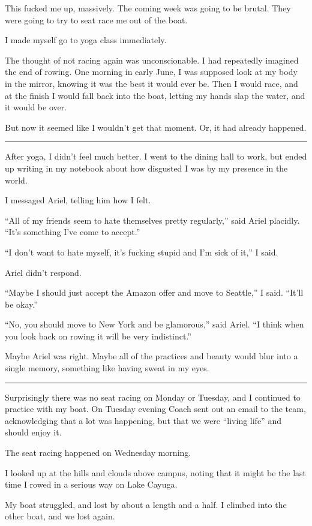 This fucked me up, massively.  The coming week was going to be brutal.  They
were going to try to seat race me out of the boat.

I made myself go to yoga class immediately.

The thought of not racing again was unconscionable.  I had repeatedly imagined
the end of rowing.  One morning in early June, I was supposed look at my body in
the mirror, knowing it was the best it would ever be.  Then I would race, and at
the finish I would fall back into the boat, letting my hands slap the water, and
it would be over.

But now it seemed like I wouldn't get that moment.  Or, it had already happened.

\plainfancybreak{12pt}{2}{}

After yoga, I didn't feel much better.  I went to the dining hall to work, but
ended up writing in my notebook about how disgusted I was by my presence in the
world.

I messaged Ariel, telling him how I felt.

``All of my friends seem to hate themselves pretty regularly,'' said Ariel
placidly.  ``It's something I've come to accept.''

``I don't want to hate myself, it's fucking stupid and I'm sick of it,'' I said.

Ariel didn't respond.

``Maybe I should just accept the Amazon offer and move to Seattle,'' I said.
``It'll be okay.''

``No, you should move to New York and be glamorous,'' said Ariel.  ``I think
when you look back on rowing it will be very indistinct.''

Maybe Ariel was right.  Maybe all of the practices and beauty would blur into a
single memory, something like having sweat in my eyes.

\plainfancybreak{12pt}{2}{}

Surprisingly there was no seat racing on Monday or Tuesday, and I continued to
practice with my boat. On Tuesday evening Coach sent out an email to the team,
acknowledging that a lot was happening, but that we were ``living life'' and
should enjoy it.

The seat racing happened on Wednesday morning.

I looked up at the hills and clouds above campus, noting that it might be the
last time I rowed in a serious way on Lake Cayuga.

My boat struggled, and lost by about a length and a half.  I climbed into the
other boat, and we lost again.

